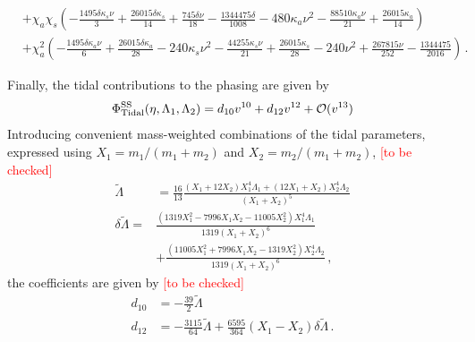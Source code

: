 \documentclass[prd,aps,letter,twocolumn,floatfix,notitlepage,nofootinbib]{revtex4-1}
\newcommand{\red}[1]{\textcolor{red}{#1}}
\begin{document}
\begin{widetext}
\begin{align}
	& + \chi_a   \chi_s  \left(-\frac{1495 \delta   \kappa_s  \nu }{3}+\frac{26015 \delta   \kappa_s }{14}+\frac{745 \delta  \nu }{18}-\frac{1344475 \delta }{1008}-480  \kappa_a  \nu ^2-\frac{88510  \kappa_a  \nu }{21}+\frac{26015  \kappa_a }{14}\right) \nonumber\\
	& + \chi_a ^2 \left(-\frac{1495 \delta   \kappa_a  \nu }{6}+\frac{26015 \delta   \kappa_a }{28}-240  \kappa_s  \nu ^2-\frac{44255  \kappa_s  \nu }{21}+\frac{26015  \kappa_s }{28}-240 \nu ^2+\frac{267815 \nu }{252}-\frac{1344475}{2016}\right)\,.
\end{align}
\end{widetext}

Finally, the tidal contributions to the phasing are given by~\cite{VinesFlanaganHinderer2011}
\begin{equation}
	\Phi_{\rm Tidal}^{\rm SS}(\eta, \Lambda_{1}, \Lambda_{2}) = d_{10} v^{10} + d_{12} v^{12} + \mathcal{O}(v^{13})
\end{equation}
Introducing convenient mass-weighted combinations of the tidal parameters, expressed using $X_{1} = m_{1}/(m_{1} + m_{2})$ and $X_{2} = m_{2}/(m_{1} + m_{2})$, \red{[to be checked]}
\begin{align}
	\tilde\Lambda &= \frac{16}{13} \frac{(X_1+12X_2)X_1^4\Lambda_1 + (12X_1+X_2)X_2^4\Lambda_2}{(X_1+X_2)^5} \nonumber\\
	\delta\tilde\Lambda =& \frac{(1319X_1^2 - 7996X_1X_2 - 11005X_2^2)X_1^4\Lambda_1}{1319(X_1+X_2)^6} \\
& + \frac{(11005X_1^2 + 7996X_1X_2 - 1319X_2^2)X_2^4\Lambda_2}{1319(X_1+X_2)^6} \,,
\end{align}
the coefficients are given by \red{[to be checked]}
\begin{align}
	d_{10} &= -\frac{39}{2}\tilde\Lambda \nonumber\\
	d_{12} &= -\frac{3115}{64}\tilde\Lambda + \frac{6595}{364}(X_1-X_2)\delta\tilde\Lambda \,.
\end{align}

  
\end{document}
